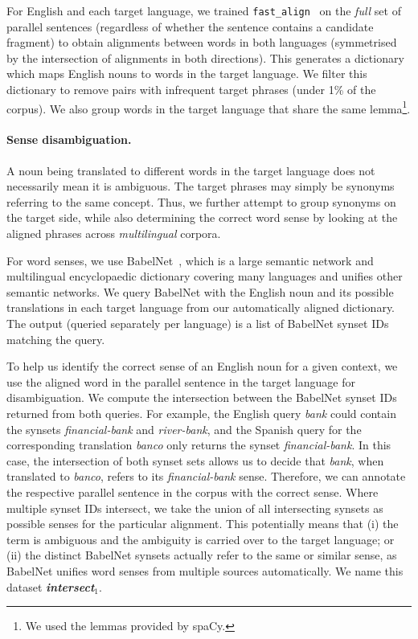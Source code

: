 \documentclass[twocolumn]{svjour3}          \smartqed  \usepackage{graphicx}
\begin{document}
For English and each target language, we trained \texttt{fast\_align}~\cite{DyerEtAl:2013} on the \emph{full} set of parallel sentences (regardless of whether the sentence contains a candidate fragment) to obtain alignments between words in both languages (symmetrised by the intersection of alignments in both directions). This generates a dictionary which maps English nouns to words in the target language. We filter this dictionary to remove pairs with infrequent target phrases (under 1\% of the corpus).
We also group words in the target language that share the same lemma\footnote{We used the lemmas provided by spaCy.}.


\paragraph{Sense disambiguation.} A noun being translated to different words in the target language does not necessarily mean it is ambiguous. The target phrases may simply be synonyms referring to the same concept. Thus, we further attempt to group synonyms on the target side, while also determining the correct word sense by looking at the aligned phrases across \emph{multilingual} corpora. 

For word senses, we use BabelNet~\cite{NavigliPonzetto:2012}, which is a large semantic network and multilingual encyclopaedic dictionary covering many languages and unifies other semantic networks. We query BabelNet with the English noun and its possible translations in each target language from our automatically aligned dictionary. The output (queried separately per language) is a list of BabelNet synset IDs matching the query.  

To help us identify the correct sense of an English noun for a given context, we use the aligned word in the parallel sentence in the target language for disambiguation. We compute the intersection between the BabelNet synset IDs returned from both queries. For example, the English query \emph{bank} could contain the synsets \emph{financial-bank} and \emph{river-bank}, and the Spanish query for the corresponding translation \emph{banco} only returns the synset \emph{financial-bank}. In this case, the intersection of both synset sets allows us to decide that \emph{bank}, when translated to \emph{banco}, refers to its \emph{financial-bank} sense. Therefore, we can annotate the respective parallel sentence in the corpus with the correct sense. Where multiple synset IDs intersect, we take the union of all intersecting synsets as possible senses for the particular alignment. This potentially means that (i) the term is ambiguous and the ambiguity is carried over to the target language; or (ii) the distinct BabelNet synsets actually refer to the same or similar sense, as BabelNet unifies word senses from multiple sources automatically. We name this dataset \textbf{\textit{intersect$_1$}}.
\end{document}
